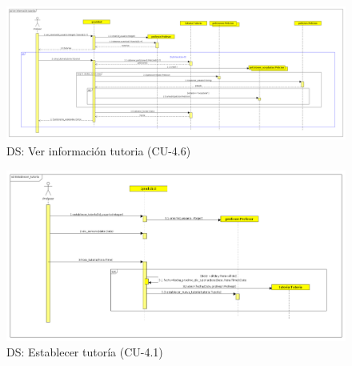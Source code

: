 \begin{figure}[H] %
\centering
\includegraphics[width=1.3\textwidth]{imagenes/diagramas/secuencia/analisis/ver_informacion_tutoria.png}  %

\caption{DS: Ver información tutoria (CU-4.6) }\label{figura77}

\end{figure}

\begin{figure}[H] %
\centering
\includegraphics[width=1.2\textwidth, right]{imagenes/diagramas/secuencia/analisis/establecer_tutoria.png}  %

\caption{DS: Establecer tutoría (CU-4.1) }\label{figura211}

\end{figure}

